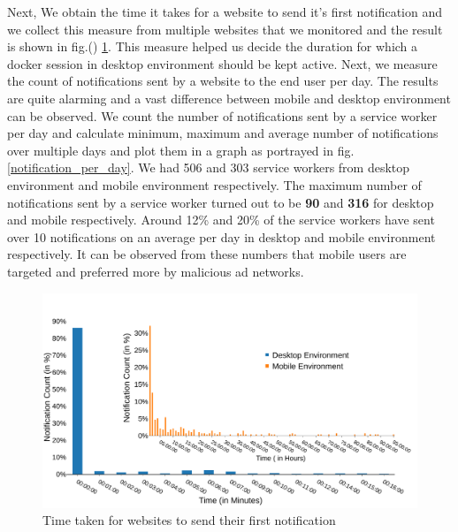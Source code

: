 Next, We obtain the time it takes for a website to send it's first notification and we collect this measure from multiple websites that we monitored and the result is shown in fig.() \ref{first_notification}. This measure helped us decide the duration for which a docker session in desktop environment should be kept active. Next, we measure the count of notifications sent by a website to the end user per day. The results are quite alarming and a vast difference between mobile and desktop environment can be observed. We count the number of notifications sent by a service worker per day and calculate minimum, maximum and average number of notifications over multiple days and plot them in a graph as portrayed in fig. \ref{notification_per_day}. We had 506 and 303 service workers from desktop environment and mobile environment respectively. The maximum number of notifications sent by a service worker turned out to be \textbf{90} and \textbf{316} for desktop and mobile respectively. Around 12\% and 20\% of the service workers have sent over 10 notifications on an average per day in desktop and mobile environment respectively. It can be observed from these numbers that mobile users are targeted and preferred more by malicious ad networks.

\begin{figure}[h]
\includegraphics[width=\columnwidth]{figs/first_notification_histo.pdf}
\caption{Time taken for websites to send their first notification}
\label{first_notification}
\end{figure}



